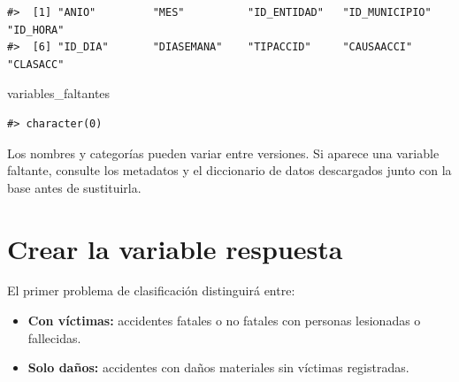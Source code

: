 \documentclass[
  spanish,
  10.5pt,
  letterpaper,
  openany,
  headings=big]{scrbook}
\newenvironment{Shaded}{}{}
\newcommand{\NormalTok}[1]{\textcolor[rgb]{0.14,0.16,0.18}{#1}}
\providecommand{\tightlist}{%
  \setlength{\itemsep}{0pt}\setlength{\parskip}{0pt}}
\begin{document}
\begin{verbatim}
#>  [1] "ANIO"         "MES"          "ID_ENTIDAD"   "ID_MUNICIPIO" "ID_HORA"     
#>  [6] "ID_DIA"       "DIASEMANA"    "TIPACCID"     "CAUSAACCI"    "CLASACC"
\end{verbatim}

\begin{Shaded}
\begin{Highlighting}[]
\NormalTok{variables\_faltantes}
\end{Highlighting}
\end{Shaded}

\begin{verbatim}
#> character(0)
\end{verbatim}

\begin{tcolorbox}[enhanced jigsaw, arc=.35mm, bottomrule=.15mm, bottomtitle=1mm, breakable, colback=white, colbacktitle=quarto-callout-warning-color!10!white, colframe=quarto-callout-warning-color-frame, coltitle=black, left=2mm, leftrule=.75mm, opacityback=0, opacitybacktitle=0.6, rightrule=.15mm, title=\textcolor{quarto-callout-warning-color}{\faExclamationTriangle}\hspace{0.5em}{Compruebe el diccionario de datos}, titlerule=0mm, toprule=.15mm, toptitle=1mm]

Los nombres y categorías pueden variar entre versiones. Si aparece una
variable faltante, consulte los metadatos y el diccionario de datos
descargados junto con la base antes de sustituirla.

\end{tcolorbox}

\section{Crear la variable respuesta}\label{crear-la-variable-respuesta}

El primer problema de clasificación distinguirá entre:

\begin{itemize}
\tightlist
\item
  \textbf{Con víctimas:} accidentes fatales o no fatales con personas
  lesionadas o fallecidas.
\item
  \textbf{Solo daños:} accidentes con daños materiales sin víctimas
  registradas.
\end{itemize}
\end{document}
